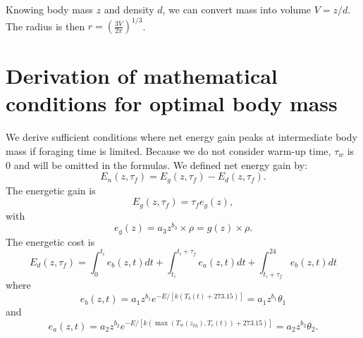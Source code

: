 \documentclass[11pt]{article}
\begin{document}
Knowing body mass $z$ and density $d$, we can convert mass into volume $ V = z/d$.
The radius is then $r = \left( \frac{3V}{2 \pi} \right)^{1/3}$.

\section{Derivation of  mathematical conditions for optimal body mass}

We derive sufficient conditions where net energy gain peaks at intermediate body mass if foraging time is limited.
Because we do not consider warm-up time, $\tau_w $ is 0 and  will be omitted in the formulas.
We defined net energy gain by:
\begin{equation} \label{eq:main}
	E_n(z, \tau_f) = E_g(z,\tau_f) - E_d(z, \tau_f).
\end{equation}
The energetic gain is
\[
	E_g(z,\tau_f) = \tau_f e_g(z),
\]
with
\begin{equation} \label{eq:eg}
	e_g(z) = a_3 z^{b_3} \times \rho  = g(z) \times \rho.
\end{equation}
%
The energetic cost is
\begin{equation} \label{eq:ed}
	E_d(z, \tau_f) = \int_0^{t_i} e_b(z, t) dt + \int_{t_i}^{t_i + \tau_f } e_a(z,t) dt + \int_{t_i+\tau_f}^{24} e_b(z, t) dt
\end{equation}
where
\begin{equation} \label{eq:eb}
	e_b(z, t) = a_1 z^{b_1} e^{-E/[k (T_b(t)+ 273.15)]} =  a_1 z^{b_1} \theta_1
\end{equation}
and
\begin{equation} \label{eq:ea}
	e_a(z,t) = a_2 z^{b_2}  e^{-E/[k (\max(T_w(z_{th}), T_e(t))+ 273.15)]} =  a_2 z^{b_2} \theta_2.
\end{equation}
\end{document}
